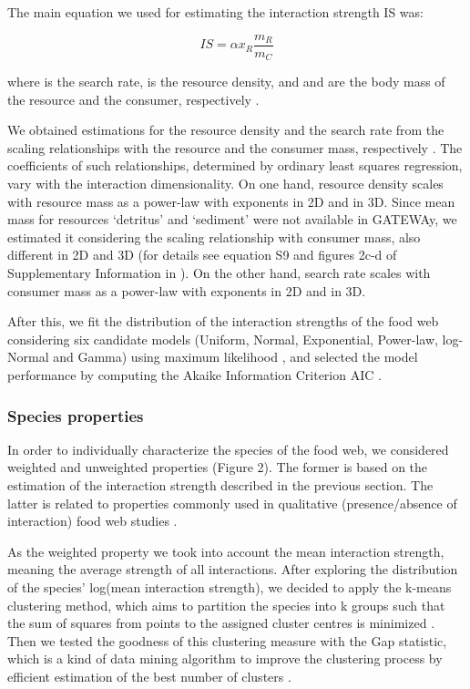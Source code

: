 \documentclass[gc, manuscript]{copernicus}
\begin{document}
The main equation we used for estimating the interaction strength IS
was:

\begin{equation}
IS = \alpha x_R \frac{m_R}{m_C}
\end{equation}

where \vec{\alpha} is the search rate,  is the resource
density, and  and  are the body mass of the resource
and the consumer, respectively \citep{Pawar2012}.

We obtained estimations for the resource density and the search rate
from the scaling relationships with the resource and the consumer mass,
respectively \citep{Pawar2012}. The coefficients of such relationships,
determined by ordinary least squares regression, vary with the
interaction dimensionality. On one hand, resource density scales with
resource mass as a power-law with exponents  in
2D and  in 3D. Since mean mass for resources
`detritus' and `sediment' were not available in GATEWAy, we estimated it
considering the scaling relationship with consumer mass, also different
in 2D and 3D (for details see equation S9 and figures 2c-d of
Supplementary Information in \citet{Pawar2012}). On the other hand,
search rate scales with consumer mass as a power-law with exponents
 in 2D and  in 3D.

After this, we fit the distribution of the interaction strengths of the
food web considering six candidate models (Uniform, Normal, Exponential,
Power-law, log-Normal and Gamma) using maximum likelihood
\citep{McCallum2008}, and selected the model performance by computing
the Akaike Information Criterion AIC \citep{Burnham2002}.

\subsubsection{Species properties}

In order to individually characterize the species of the food web, we
considered weighted and unweighted properties (Figure 2). The former is
based on the estimation of the interaction strength described in the
previous section. The latter is related to properties commonly used in
qualitative (presence/absence of interaction) food web studies
\citep{Martinez1991, Dunne2002, Borrelli2014}.

As the weighted property we took into account the mean interaction
strength, meaning the average strength of all interactions. After
exploring the distribution of the species' log(mean interaction
strength), we decided to apply the k-means clustering method, which aims
to partition the species into k groups such that the sum of squares from
points to the assigned cluster centres is minimized
\citep{Hartigan1979}. Then we tested the goodness of this clustering
measure with the Gap statistic, which is a kind of data mining algorithm
to improve the clustering process by efficient estimation of the best
number of clusters \citep{Tibshirani2001}.
\end{document}
